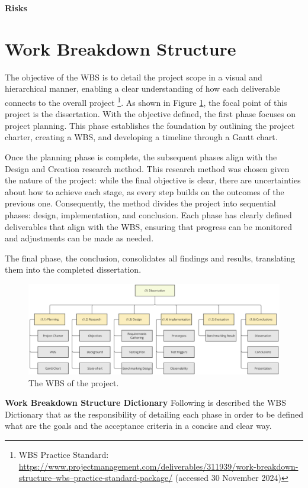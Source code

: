 \noindent \textbf{Risks}


\section{Work Breakdown Structure}

The objective of the \gls{WBS} is to detail the project scope in a visual and hierarchical manner, enabling a clear understanding of how each deliverable connects to the overall project \footnote{WBS Practice Standard: \url{https://www.projectmanagement.com/deliverables/311939/work-breakdown-structure–wbs–practice-standard-package/} (accessed 30 November 2024)}. As shown in Figure \ref{fig:wbs}, the focal point of this project is the dissertation. With the objective defined, the first phase focuses on project planning. This phase establishes the foundation by outlining the project charter, creating a \gls{WBS}, and developing a timeline through a Gantt chart.

Once the planning phase is complete, the subsequent phases align with the Design and Creation research method. This research method was chosen given the nature of the project: while the final objective is clear, there are uncertainties about how to achieve each stage, as every step builds on the outcomes of the previous one. Consequently, the method divides the project into sequential phases: design, implementation, and conclusion. Each phase has clearly defined deliverables that align with the \gls{WBS}, ensuring that progress can be monitored and adjustments can be made as needed.

The final phase, the conclusion, consolidates all findings and results, translating them into the completed dissertation.


\begin{figure}
    \includegraphics[width=\linewidth]{ch-planning/assets/wbs.png}
    \caption{The \gls{WBS} of the project.}
    \label{fig:wbs}
\end{figure}


\textbf{Work Breakdown Structure Dictionary} Following is described the \gls{WBS} Dictionary that as the responsibility of detailing each phase in order to be defined what are the goals and the acceptance criteria in a concise and clear way.

